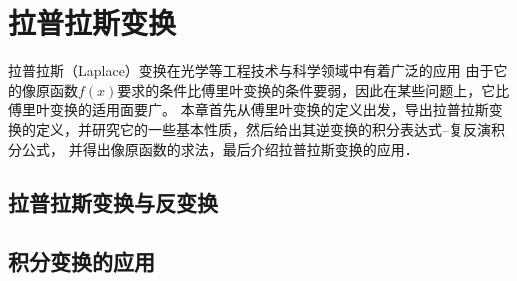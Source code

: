 \chapter{拉普拉斯变换}
拉普拉斯（Laplace）变换在光学等工程技术与科学领域中有着广泛的应用
% 
由于它的像原函数$f(x)$要求的条件比傅里叶变换的条件要弱，因此在某些问题上，它比傅里叶变换的适用面要广。
本章首先从傅里叶变换的定义出发，导出拉普拉斯变换的定义，并研究它的一些基本性质，然后给出其逆变换的积分表达式--复反演积分公式，
并得出像原函数的求法，最后介绍拉普拉斯变换的应用．
\section{拉普拉斯变换与反变换}
\label{sec:laplace_transform_and_inverse_transform}



\section{积分变换的应用}
\label{sec:integral_transform_applications}
